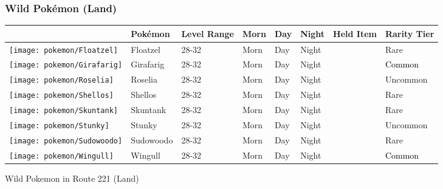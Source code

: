 \subsubsection{Wild Pokémon (Land)}%
\label{ssubsec:WildPokmon(Land)}%
\begin{longtable}{||l l l l l l l l||}%
\hline%
\rowcolor{GroundColor}%
&Pokémon&Level Range&Morn&Day&Night&Held Item&Rarity Tier\\%
\hline%
\endhead%
\hline%
\rowcolor{GroundColor}%
\texttt{[image: pokemon/Floatzel]}&Floatzel&28{-}32&Morn&Day&Night&&\textcolor{RedOrange}{%
Rare%
}\\%
\hline%
\rowcolor{GroundColor}%
\texttt{[image: pokemon/Girafarig]}&Girafarig&28{-}32&Morn&Day&Night&&\textcolor{black}{%
Common%
}\\%
\hline%
\rowcolor{GroundColor}%
\texttt{[image: pokemon/Roselia]}&Roselia&28{-}32&Morn&Day&Night&&\textcolor{OliveGreen}{%
Uncommon%
}\\%
\hline%
\rowcolor{GroundColor}%
\texttt{[image: pokemon/Shellos]}&Shellos&28{-}32&Morn&Day&Night&&\textcolor{RedOrange}{%
Rare%
}\\%
\hline%
\rowcolor{GroundColor}%
\texttt{[image: pokemon/Skuntank]}&Skuntank&28{-}32&Morn&Day&Night&&\textcolor{RedOrange}{%
Rare%
}\\%
\hline%
\rowcolor{GroundColor}%
\texttt{[image: pokemon/Stunky]}&Stunky&28{-}32&Morn&Day&Night&&\textcolor{OliveGreen}{%
Uncommon%
}\\%
\hline%
\rowcolor{GroundColor}%
\texttt{[image: pokemon/Sudowoodo]}&Sudowoodo&28{-}32&Morn&Day&Night&&\textcolor{RedOrange}{%
Rare%
}\\%
\hline%
\rowcolor{GroundColor}%
\texttt{[image: pokemon/Wingull]}&Wingull&28{-}32&Morn&Day&Night&&\textcolor{black}{%
Common%
}\\%
\hline%
\end{longtable}%
\caption{Wild Pokemon in Route 221 (Land)}